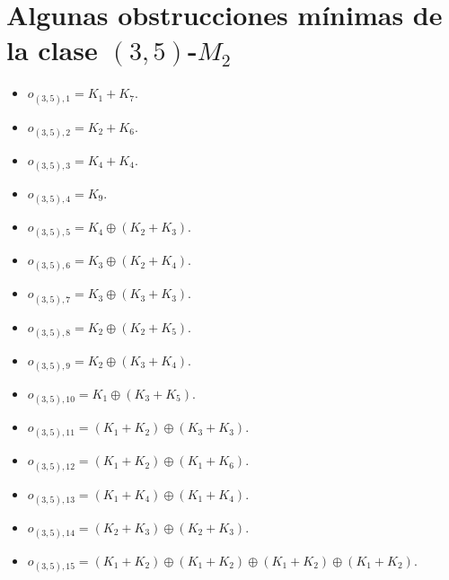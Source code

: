 \section{Algunas obstrucciones mínimas de la clase $(3,5)$-$M_2$}
\begin{itemize}
    \item $o_{(3,5),1} = K_1+K_7$.
    \item $o_{(3,5),2} = K_2+K_6$.
    \item $o_{(3,5),3} = K_4+K_4$.
    \item $o_{(3,5),4} = K_9$.
    \item $o_{(3,5),5} = K_4\oplus(K_2+K_3)$.
    \item $o_{(3,5),6} = K_3\oplus(K_2+K_4)$.
    \item $o_{(3,5),7} = K_3\oplus(K_3+K_3)$.
    \item $o_{(3,5),8} = K_2\oplus(K_2+K_5)$.
    \item $o_{(3,5),9} = K_2\oplus(K_3+K_4)$.
    \item $o_{(3,5),10} = K_1\oplus(K_3+K_5)$.
    \item $o_{(3,5),11} = (K_1+K_2)\oplus(K_3+K_3)$.
    \item $o_{(3,5),12} = (K_1+K_2)\oplus(K_1+K_6)$.
    \item $o_{(3,5),13} = (K_1+K_4)\oplus(K_1+K_4)$.
    \item $o_{(3,5),14} = (K_2+K_3)\oplus(K_2+K_3)$.
    \item $o_{(3,5),15} = (K_1+K_2)\oplus(K_1+K_2)\oplus(K_1+K_2)\oplus(K_1+K_2)$.
\end{itemize}

